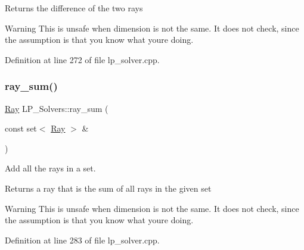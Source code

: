\begin{DoxyReturn}{Returns}
the difference of the two rays 
\end{DoxyReturn}
\begin{DoxyWarning}{Warning}
This is unsafe when dimension is not the same. It does not check, since the assumption is that you know what you\textquotesingle{}re doing. 
\end{DoxyWarning}


Definition at line 272 of file lp\+\_\+solver.\+cpp.

\mbox{\label{group___c_l_s_solvers_ga42f6aa14b6c3adb4df26f8338d486401}} 
\subsubsection{\texorpdfstring{ray\+\_\+sum()}{ray\_sum()}}
{\footnotesize\ttfamily \hyperlink{group___c_l_s_solvers_class_l_p___solvers_1_1_ray}{Ray} L\+P\+\_\+\+Solvers\+::ray\+\_\+sum (\begin{DoxyParamCaption}\item[{const set$<$ \hyperlink{group___c_l_s_solvers_class_l_p___solvers_1_1_ray}{Ray} $>$ \&}]{ }\end{DoxyParamCaption})}



Add all the rays in a set. 

\begin{DoxyReturn}{Returns}
a ray that is the sum of all rays in the given set 
\end{DoxyReturn}
\begin{DoxyWarning}{Warning}
This is unsafe when dimension is not the same. It does not check, since the assumption is that you know what you\textquotesingle{}re doing. 
\end{DoxyWarning}


Definition at line 283 of file lp\+\_\+solver.\+cpp.

\mbox{\label{group___c_l_s_solvers_ga8b57096f9dac0f00912dd248cfdc89db}} 
